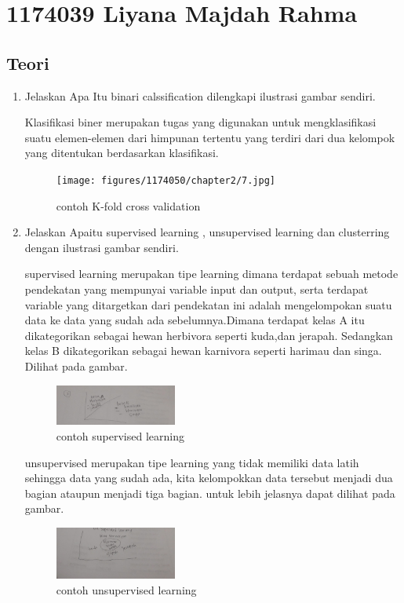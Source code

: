 \section{1174039 Liyana Majdah Rahma}

\subsection{Teori}
\begin{enumerate}
\item Jelaskan Apa Itu binari calssification dilengkapi ilustrasi gambar sendiri.\par
Klasifikasi biner merupakan tugas yang digunakan untuk mengklasifikasi suatu elemen-elemen dari himpunan tertentu yang terdiri dari dua kelompok yang ditentukan berdasarkan klasifikasi.
\begin{figure}[ht]
\centering
\texttt{[image: figures/1174050/chapter2/7.jpg]}
\caption{contoh K-fold cross validation}
\label{contoh}
\end{figure}




\item Jelaskan Apaitu supervised learning , unsupervised learning dan clusterring dengan ilustrasi gambar sendiri.\par
supervised learning merupakan tipe learning dimana terdapat sebuah metode pendekatan yang mempunyai variable input dan output, serta terdapat variable yang ditargetkan dari pendekatan ini adalah mengelompokan suatu data ke data yang sudah ada sebelumnya.Dimana terdapat kelas A itu dikategorikan sebagai hewan herbivora seperti kuda,dan jerapah. Sedangkan kelas B dikategorikan sebagai hewan karnivora seperti harimau dan singa. Dilihat pada gambar.\par
\begin{figure}[H]
\centering
\includegraphics[width= 4cm]{figures/1174039/chapter2/2.jpeg}
\caption{contoh supervised learning}

\end{figure}


unsupervised merupakan tipe learning yang tidak memiliki data latih sehingga data yang sudah ada, kita kelompokkan data tersebut menjadi dua bagian ataupun menjadi tiga bagian. untuk lebih jelasnya dapat dilihat pada gambar.\par
\begin{figure}[H]
\centering
\includegraphics[width= 4cm]{figures/1174039/chapter2/3.jpeg}
\caption{contoh unsupervised learning}


\end{figure}
\end{enumerate}

